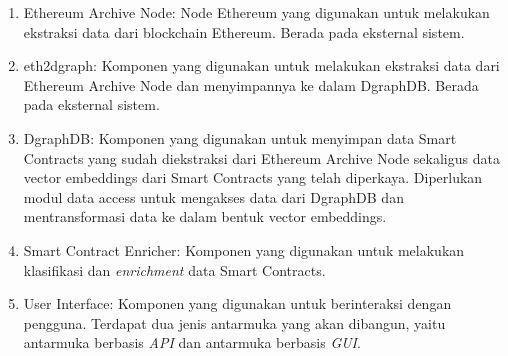 \begin{enumerate}
	\item Ethereum Archive Node: Node Ethereum yang digunakan untuk melakukan ekstraksi data dari blockchain Ethereum. Berada pada eksternal sistem.
	\item eth2dgraph: Komponen yang digunakan untuk melakukan ekstraksi data dari Ethereum Archive Node dan menyimpannya ke dalam DgraphDB. Berada pada eksternal sistem.
	\item DgraphDB: Komponen yang digunakan untuk menyimpan data Smart Contracts yang sudah diekstraksi dari Ethereum Archive Node sekaligus data vector embeddings dari Smart Contracts yang telah diperkaya. Diperlukan modul data access untuk mengakses data dari DgraphDB dan mentransformasi data ke dalam bentuk vector embeddings.
	\item Smart Contract Enricher: Komponen yang digunakan untuk melakukan klasifikasi dan \textit{enrichment} data Smart Contracts.
	\item User Interface: Komponen yang digunakan untuk berinteraksi dengan pengguna. Terdapat dua jenis antarmuka yang akan dibangun, yaitu antarmuka berbasis \textit{API} dan antarmuka berbasis \textit{GUI}.
\end{enumerate}







